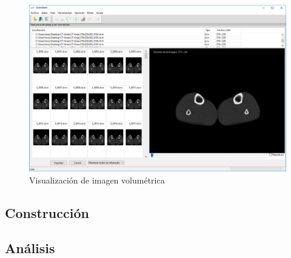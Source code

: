 \documentclass{article}
\begin{document}
\begin{figure}[!ht]
	\includegraphics[width=\textwidth]{images/handling/5}
	\caption{Visualización de imagen volumétrica}
	\label{fig:handling:2}
\end{figure}

\newpage
\subsection{Construcción}
\label{interface:construction}

\subsection{Análisis}
\label{interface:analysis}

\end{document}
